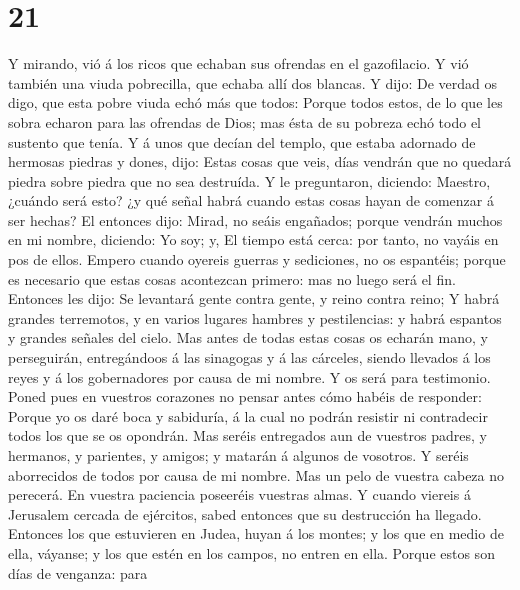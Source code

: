 \hypertarget{section-20}{%
\section{21}\label{section-20}}

 Y mirando, vió á los ricos que echaban sus ofrendas en el
gazofilacio.  Y vió también una viuda pobrecilla, que echaba
allí dos blancas.  Y dijo: De verdad os digo, que esta pobre
viuda echó más que todos:  Porque todos estos, de lo que les
sobra echaron para las ofrendas de Dios; mas ésta de su pobreza echó
todo el sustento que tenía.  Y á unos que decían del templo,
que estaba adornado de hermosas piedras y dones, dijo: 
Estas cosas que veis, días vendrán que no quedará piedra sobre piedra
que no sea destruída.  Y le preguntaron, diciendo: Maestro,
¿cuándo será esto? ¿y qué señal habrá cuando estas cosas hayan de
comenzar á ser hechas?  El entonces dijo: Mirad, no seáis
engañados; porque vendrán muchos en mi nombre, diciendo: Yo soy; y, El
tiempo está cerca: por tanto, no vayáis en pos de ellos. 
Empero cuando oyereis guerras y sediciones, no os espantéis; porque es
necesario que estas cosas acontezcan primero: mas no luego será el fin.
 Entonces les dijo: Se levantará gente contra gente, y
reino contra reino;  Y habrá grandes terremotos, y en
varios lugares hambres y pestilencias: y habrá espantos y grandes
señales del cielo.  Mas antes de todas estas cosas os
echarán mano, y perseguirán, entregándoos á las sinagogas y á las
cárceles, siendo llevados á los reyes y á los gobernadores por causa de
mi nombre.  Y os será para testimonio.  Poned
pues en vuestros corazones no pensar antes cómo habéis de responder:
 Porque yo os daré boca y sabiduría, á la cual no podrán
resistir ni contradecir todos los que se os opondrán.  Mas
seréis entregados aun de vuestros padres, y hermanos, y parientes, y
amigos; y matarán á algunos de vosotros.  Y seréis
aborrecidos de todos por causa de mi nombre.  Mas un pelo
de vuestra cabeza no perecerá.  En vuestra paciencia
poseeréis vuestras almas.  Y cuando viereis á Jerusalem
cercada de ejércitos, sabed entonces que su destrucción ha llegado.
 Entonces los que estuvieren en Judea, huyan á los montes;
y los que en medio de ella, váyanse; y los que estén en los campos, no
entren en ella.  Porque estos son días de venganza: para
